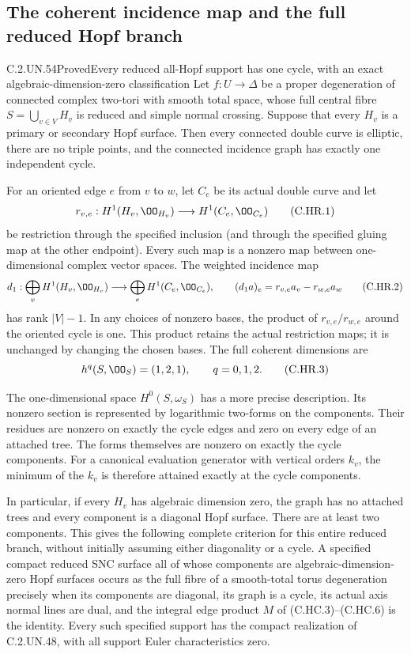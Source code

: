 \subsection{The coherent incidence map and the full reduced Hopf branch}

\begin{statement}{C.2.UN.54}{Proved}{Every reduced all-Hopf support has one cycle, with an exact algebraic-dimension-zero classification}
Let $f:U\to\Delta$ be a proper degeneration of connected complex
two-tori with smooth total space, whose full central fibre
$S=\bigcup_{v\in V}H_v$ is reduced and simple normal crossing.
Suppose that every $H_v$ is a primary or secondary Hopf surface.
Then every connected double curve is elliptic, there are no triple
points, and the connected incidence graph has exactly one independent
cycle.

For an oriented edge $e$ from $v$ to $w$, let $C_e$ be its actual
double curve and let
\[
 r_{v,e}:H^1(H_v,\OO_{H_v})\longrightarrow H^1(C_e,\OO_{C_e})
                                                        \tag{C.HR.1}
\]
be restriction through the specified inclusion (and through the
specified gluing map at the other endpoint). Every such map is a
nonzero map between one-dimensional complex vector spaces. The
weighted incidence map
\[
 d_1:\bigoplus_vH^1(H_v,\OO_{H_v})
       \longrightarrow\bigoplus_eH^1(C_e,\OO_{C_e}),\qquad
 (d_1a)_e=r_{v,e}a_v-r_{w,e}a_w
                                                        \tag{C.HR.2}
\]
has rank $|V|-1$. In any choices of nonzero bases, the product of
$r_{v,e}/r_{w,e}$ around the oriented cycle is one. This product
retains the actual restriction maps; it is unchanged by changing
the chosen bases. The full coherent dimensions are
\[
                    h^q(S,\OO_S)=(1,2,1),\qquad q=0,1,2.
                                                        \tag{C.HR.3}
\]

The one-dimensional space $H^0(S,\omega_S)$ has a more precise
description. Its nonzero section is represented by logarithmic
two-forms on the components. Their residues are nonzero on exactly
the cycle edges and zero on every edge of an attached tree. The
forms themselves are nonzero on exactly the cycle components.
For a canonical evaluation generator with vertical orders $k_v$,
the minimum of the $k_v$ is therefore attained exactly at the
cycle components.

In particular, if every $H_v$ has algebraic dimension zero, the
graph has no attached trees and every component is a diagonal Hopf
surface. There are at least two components. This gives the following
complete criterion for this entire reduced branch, without initially
assuming either diagonality or a cycle. A specified compact reduced
SNC surface all of whose components are algebraic-dimension-zero
Hopf surfaces occurs as the full fibre of a smooth-total torus
degeneration precisely when its components are diagonal, its graph
is a cycle, its actual axis normal lines are dual, and the integral
edge product $M$ of (C.HC.3)--(C.HC.6) is the identity. Every such
specified support has the compact realization of C.2.UN.48, with
all support Euler characteristics zero.
\end{statement}


